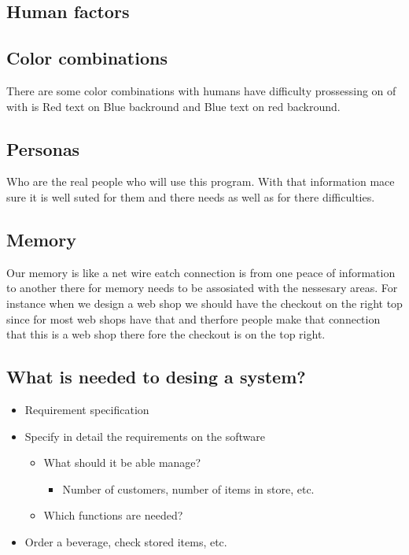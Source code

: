 \begin{multicols}{2}
\section{Human factors}
\subsection{Color combinations}
There are some color combinations with humans have difficulty prossessing on of with is
Red text on Blue backround and Blue text on red backround.

\subsection{Personas}
Who are the real people who will use this program. With that information mace sure it
is well suted for them and there needs as well as for there difficulties.

\subsection{Memory}
Our memory is like a net wire eatch connection is from one peace of information to another
there for memory needs to be assosiated with the nessesary areas. For instance when we
design a web shop we should have the checkout on the right top since for most web shops have
that and therfore people make that connection that this is a web shop there fore the checkout
is on the top right.

\subsection{What is needed to desing a system?}
\begin{itemize}
\item Requirement specification
\item Specify in detail the requirements on the software
  \begin{itemize}
  \item What should it be able manage?
    \begin{itemize}
    \item Number of customers, number of items in store, etc.
    \end{itemize}
  \item Which functions are needed?
  \end{itemize}
\item Order a beverage, check stored items, etc.
\end{itemize}


\end{multicols}
